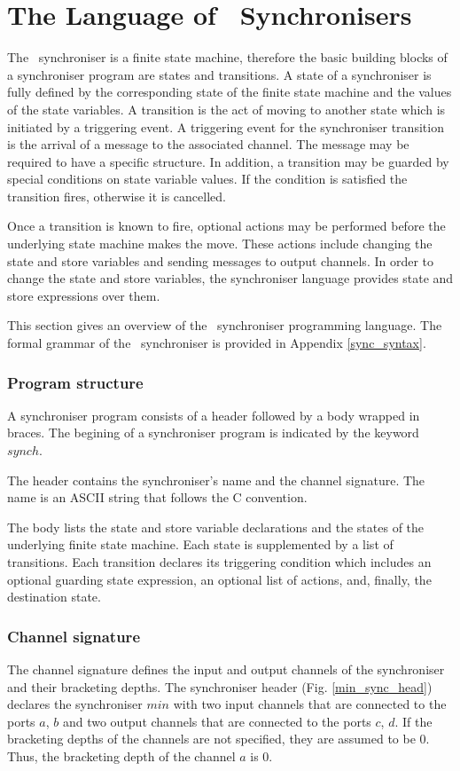 \section{The Language of \ak\ Synchronisers}
The \ak\ synchroniser is a finite state machine, therefore the basic building blocks of a synchroniser program are states and transitions. A state of a synchroniser is fully defined by the corresponding state of the finite state machine and the values of the state variables. A transition is the act of moving to another state which is initiated by a triggering event. A triggering event for the synchroniser transition is the arrival of a message to the associated channel. The message may be required to have a specific structure. In addition, a transition may be guarded by special conditions on state variable values. If the condition is satisfied the transition fires, otherwise it is cancelled.

Once a transition is known to fire, optional actions may be performed before the underlying state machine makes the move. These actions include changing the state and store variables and sending messages to output channels. In order to change the state and store variables, the synchroniser language provides state and store expressions over them.

This section gives an overview of the \ak\ synchroniser programming language. The formal grammar of the \ak\ synchroniser is provided in Appendix \ref{sync_syntax}.

  \subsubsection{Program structure}
A synchroniser program consists of a header followed by a body wrapped in braces. The begining of a synchroniser program is indicated by the keyword $synch$.

The header contains the synchroniser's name and the channel signature. The name is an ASCII string that follows the C convention.

The body lists the state and store variable declarations and the states of the underlying finite state machine. Each state is supplemented by a list of transitions. Each transition declares its triggering condition which includes an optional guarding state expression, an optional list of actions, and, finally, the destination state.


  \subsubsection{Channel signature}
The channel signature defines the input and output channels of the synchroniser and their bracketing depths. The synchroniser header (Fig. \ref{min_sync_head}) declares the synchroniser $min$ with two input channels that are connected to the ports $a$, $b$ and two output channels that are connected to the ports $c$, $d$. If the bracketing depths of the channels are not specified, they are assumed to be 0. Thus, the bracketing depth of the channel $a$ is 0.

